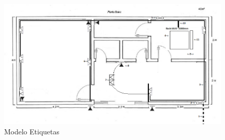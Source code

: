 \begin{figure}
	\centering
	\includegraphics[width=\textwidth]{fig5}
	\caption{Modelo Etiquetas}
	\label{fig5}
\end{figure}
